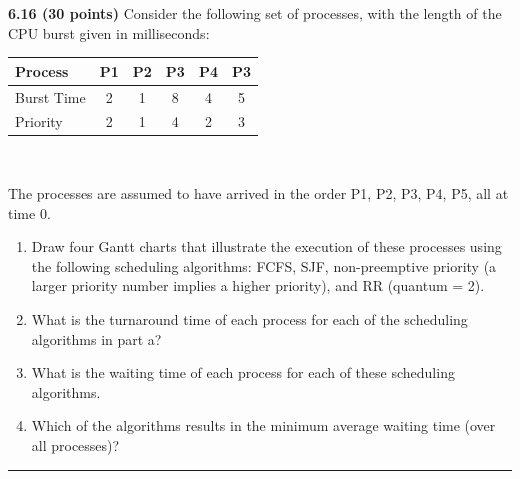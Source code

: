\documentclass[12pt]{jhwhw}
\begin{document}
\textbf{6.16 (30 points)} 
	Consider the following set of processes, with the length of the CPU
	burst given in milliseconds: \\
	\begin{centering}
	\begin{tabular}{| l | c | c | c | c | c |}
		\hline
		Process & P1 & P2 & P3 & P4 & P3 \\
		\hline
		Burst Time & 2 & 1 & 8 & 4 & 5 \\
		\hline
		Priority & 2 & 1 & 4 & 2 & 3 \\
		\hline
	\end{tabular} \\
	\end{centering}
	\bigbreak
	The processes are assumed to have arrived in the order P1, P2, P3, P4, P5, all at 
	time 0.
	\begin{enumerate}
		\item Draw four Gantt charts that illustrate the execution of these processes using the
			following scheduling algorithms: FCFS, SJF, non-preemptive priority (a larger
			priority number implies a higher priority), and RR (quantum = 2).
		\item What is the turnaround time of each process for each of the scheduling algorithms
			in part a?
		\item What is the waiting time of each process for each of these scheduling algorithms.
		\item Which of the algorithms results in the minimum average waiting time
			(over all processes)?
	\end{enumerate}
\textcolor[RGB]{240,240,240}{\rule{\textwidth}{0.5pt}}\bigbreak
\end{document}
